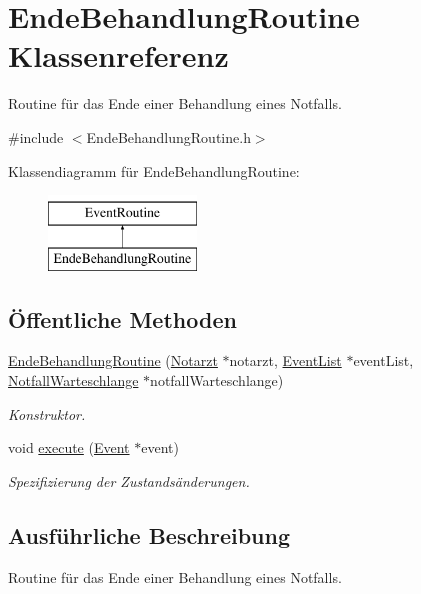 \hypertarget{classEndeBehandlungRoutine}{}\section{Ende\+Behandlung\+Routine Klassenreferenz}
\label{classEndeBehandlungRoutine}


Routine für das Ende einer Behandlung eines Notfalls.  




{\ttfamily \#include $<$Ende\+Behandlung\+Routine.\+h$>$}

Klassendiagramm für Ende\+Behandlung\+Routine\+:\begin{figure}[H]
\begin{center}
\leavevmode
\includegraphics[height=2.000000cm]{classEndeBehandlungRoutine}
\end{center}
\end{figure}
\subsection*{Öffentliche Methoden}
\begin{DoxyCompactItemize}
\item 
\hyperlink{classEndeBehandlungRoutine_a62832ad29d885996aef9ca7f3a8ca169}{Ende\+Behandlung\+Routine} (\hyperlink{classNotarzt}{Notarzt} $\ast$notarzt, \hyperlink{classEventList}{Event\+List} $\ast$event\+List, \hyperlink{classNotfallWarteschlange}{Notfall\+Warteschlange} $\ast$notfall\+Warteschlange)
\begin{DoxyCompactList}\small\item\em Konstruktor. \end{DoxyCompactList}\item 
void \hyperlink{classEndeBehandlungRoutine_a462bdb38325bd4b5d550d4d9145e1558}{execute} (\hyperlink{classEvent}{Event} $\ast$event)
\begin{DoxyCompactList}\small\item\em Spezifizierung der Zustandsänderungen. \end{DoxyCompactList}\end{DoxyCompactItemize}


\subsection{Ausführliche Beschreibung}
Routine für das Ende einer Behandlung eines Notfalls. 

